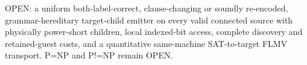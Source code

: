 \documentclass[11pt]{article}
\begin{document}
OPEN: a uniform both-label-correct, clause-changing or soundly re-encoded, grammar-hereditary target-child emitter on every valid connected source with physically power-short children, local indexed-bit access, complete discovery and retained-guest costs, and a quantitative same-machine SAT-to-target FLMV transport. P=NP and P!=NP remain OPEN.
\end{document}
